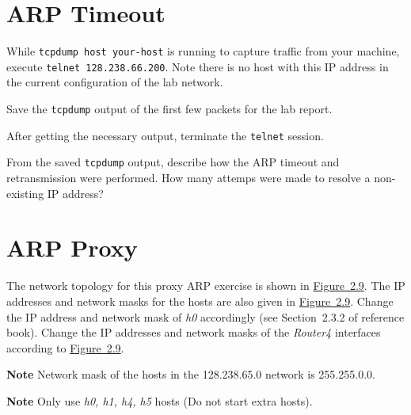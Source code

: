 \documentclass{../UTNetLab}
\begin{document}
\section{ARP Timeout}
    While \lstinline[emph={your-host}]{tcpdump host your-host} is running to capture traffic from your machine, execute \lstinline{telnet 128.238.66.200}.
    Note there is no host with this IP address in the current configuration of the lab network.

    Save the \lstinline{tcpdump} output of the first few packets for the lab report.

    After getting the necessary output, terminate the \lstinline{telnet} session.

    \begin{report}
    \item From the saved \lstinline{tcpdump} output, describe how the ARP timeout and retransmission were performed.
    How many attemps were made to resolve a non-existing IP address?
    \end{report}

\section{ARP Proxy}
    The network topology for this proxy ARP exercise is shown in \hyperref[fig:2.9]{Figure~2.9}.
    The IP addresses and network masks for the hosts are also given in \hyperref[fig:2.9]{Figure~2.9}.
    Change the IP address and network mask of \textit{h0} accordingly (see Section~2.3.2 of reference book).
    Change the IP addresses and network masks of the \textit{Router4} interfaces according to \hyperref[fig:2.9]{Figure~2.9}.

    \textbf{Note}\quad
    Network mask of the hosts in the 128.238.65.0 network is 255.255.0.0.
    
    \textbf{Note}\quad
    Only use \textit{h0, h1, h4, h5} hosts (Do not start extra hosts).
\end{document}
